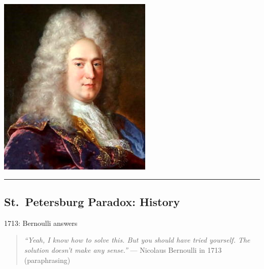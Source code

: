 \documentclass[
  letterpaper,
  DIV=11,
  numbers=noendperiod]{scrartcl}
\begin{document}
\includegraphics[width=0.8\linewidth,height=\textheight,keepaspectratio]{figures/Montmort.jpg}

\begin{center}\rule{0.5\linewidth}{0.5pt}\end{center}

\subsection{St.~Petersburg Paradox:
History}\label{st.-petersburg-paradox-history-2}

1713: Bernoulli answers

\begin{quote}
\emph{``Yeah, I know how to solve this. But you should have tried
yourself. The solution doesn't make any sense.''} --- Nicolaus Bernoulli
in 1713 (paraphrasing)
\end{quote}
\end{document}
